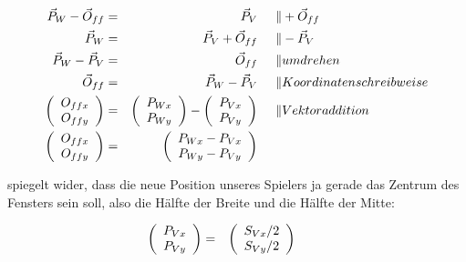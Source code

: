 \begin{align}
	\vec{P}_W - \vec{O}_{ff}  &=& \vec{P}_V                   &\hspace{0.5cm}\| + \vec{O}_{ff}\label{off00}\\
	\vec{P}_W                 &=& \vec{P}_V  + \vec{O}_{ff}   &\hspace{0.5cm}\| - \vec{P}_{V}\nonumber\\
	\vec{P}_W - \vec{P}_V     &=& \vec{O}_{ff}                &\hspace{0.5cm}\| umdrehen\nonumber\\
	\vec{O}_{ff}              &=& \vec{P}_W - \vec{P}_V       &\hspace{0.5cm}\| Koordinatenschreibweise\nonumber\\
	\left(\begin{array}{c} O_{ffx} \\ O_{ffy} \end{array}\right) &=& \left(\begin{array}{c} P_{Wx} \\ P_{Wy} \end{array}\right)  - \left(\begin{array}{c} P_{Vx} \\ P_{Vy} \end{array}\right) &\hspace{0.5cm}\| Vektoraddition\nonumber\\
\left(\begin{array}{c} O_{ffx} \\ O_{ffy} \end{array}\right) &=& \left(\begin{array}{c} P_{Wx} - P_{Vx}\\  P_{Wy} - P_{Vy}\end{array}\right)&\hspace{0.5cm}\label{off01}
\end{align}

  spiegelt wider, dass die neue Position unseres Spielers ja gerade das Zentrum des Fensters sein soll, also die Hälfte der Breite und die Hälfte der Mitte:
 
\begin{align}
	\left(\begin{array}{c} P_{Vx}  \\ P_{Vy}  \end{array}\right) &=& \left(\begin{array}{c} S_{Vx} / 2\\ S_{Vy} / 2 \end{array}\right) & \hspace{0.5cm}\label{off02}
\end{align}

